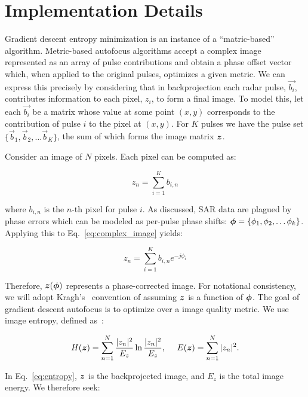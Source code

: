 \section{Implementation Details}\label{sec:implementation}

Gradient descent entropy minimization is an instance of a ``matric-based''
algorithm. Metric-based autofocus algorithms accept a complex image represented
as an array of pulse contributions and obtain a phase offset vector which, when
applied to the original pulses, optimizes a given metric. We can express this
precisely by considering that in backprojection each radar pulse, $\vec{b_i}$,
contributes information to each pixel, $z_i$, to form a final image. To model
this, let each $\vec{b_i}$ be a matrix whose value at some point $(x,y)$
corresponds to the contribution of pulse $i$ to the pixel at $(x,y)$.  For $K$
pulses we have the pulse set $\{\vec{b}_1, \vec{b}_2, \dots \vec{b}_K\}$,
the sum of which forms the image matrix $\bm{z}$.

Consider an image of $N$ pixels. Each pixel can be computed as:

\begin{equation}\label{eq:complex_image}
z_n = \sum_{i=1}^{K} b_{i,n}
\end{equation}

where $b_{i,n}$ is the $n$-th pixel for pulse $i$. As discussed, SAR data are
plagued by phase errors which can be modeled as per-pulse phase shifts:
$\bm{\phi} = \{\phi_1, \phi_2, \dots \phi_k\}$. Applying this to
Eq.~\ref{eq:complex_image} yields:

\begin{equation}\label{eq:phase_complex_image}
z_n = \sum_{i=1}^{K} b_{i,n}e^{-j\phi_i}
\end{equation}

Therefore, $\bm{z}(\bm{\phi})$ represents a phase-corrected image. For notational
consistency, we will adopt Kragh's~\cite{kragh2006monotonic} convention of
assuming $\bm{z}$ is a function of $\bm{\phi}$.  The goal of gradient descent autofocus
is to optimize over a image quality metric. We use image entropy, defined
as~\cite{kragh2006monotonic}:

\begin{equation}\label{eq:entropy}
  H(\zb) = \sum_{n=1}^{N} \frac{|z_n|^2}{E_z} \ln
  \frac{|z_n|^2}{E_z}
  \text{,\indent} E(\zb) = \sum_{n=1}^{N} |z_n|^2.
\end{equation}

In Eq.~\ref{eq:entropy}, $\bm{z}$ is the backprojected image, and $E_z$ is the
total image energy. We therefore seek:


